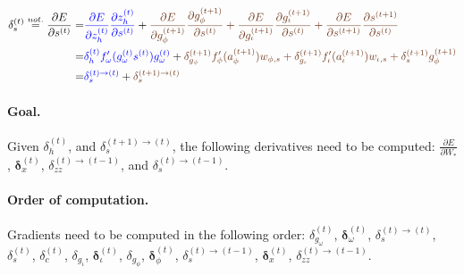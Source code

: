 \documentclass[11pt]{article}
\begin{document}
\begin{equation}
\begin{split}
    \delta_{s}^{(t)} \overset{not.}{=} \displaystyle\frac{\partial E}{\partial s^{(t)}} = &
    {\color{blue} \displaystyle\frac{\partial E}{\partial z_h^{(t)}}
    \displaystyle\frac{\partial z_h^{(t)}}{\partial s^{(t)}}} +
    {\color{auburn}\displaystyle\frac{\partial E}{\partial g_{\phi}^{(t+1)}}
    \displaystyle\frac{\partial g_{\phi}^{(t+1)}}{\partial s^{(t)}} +
    \displaystyle\frac{\partial E}{\partial g_{\iota}^{(t+1)}}
    \displaystyle\frac{\partial g_{\iota}^{(t+1)}}{\partial s^{(t)}} +
    \displaystyle\frac{\partial E}{\partial s^{(t+1)}}
    \displaystyle\frac{\partial s^{(t+1)}}{\partial s^{(t)}}} \\
    = & {\color{blue} \delta_{h}^{(t)} f_{\omega}'(g_{\omega}^{(t)}s^{(t)}) g_{\omega}^{(t)}} +
        {\color{auburn}\delta_{g_{\phi}}^{(t+1)}f_{\phi}'(a_{\phi}^{(t+1)})w_{\phi, s} +
        \delta_{g_{\iota}}^{(t+1)}f_{\iota}'(a_{\iota}^{(t+1)})w_{\iota, s} +
        \delta_{s}^{(t+1)}g_{\phi}^{(t+1)}} \\
    = & {\color{blue}\delta^{(t) \rightarrow (t)}_s} +
        {\color{auburn}\delta^{(t+1) \rightarrow (t)}_s}
\end{split}
\end{equation}

\paragraph{Goal.} Given $\delta_h^{(t)}$, and $\delta^{(t+1) \rightarrow (t)}_s$, the following derivatives need to be computed: $\displaystyle \frac{\partial E}{\partial W_{*}}$, $\boldsymbol{\delta}_x^{(t)}$, $\delta_{zz}^{(t)\rightarrow(t-1)}$, and $\delta^{(t) \rightarrow (t-1)}_s$.

\paragraph{Order of computation.}
Gradients need to be computed in the following order: $\delta_{g_{\omega}}^{(t)}$, $\boldsymbol{\delta}_{\omega}^{(t)}$, $\delta_s^{(t) \rightarrow (t)}$, $\delta_s^{(t)}$, $\delta_c^{(t)}$, $\delta_{g_{\iota}}$, $\boldsymbol{\delta}_{\iota}^{(t)}$, $\delta_{g_{\phi}}$, $\boldsymbol{\delta}_{\phi}^{(t)}$,
$\delta_s^{(t) \rightarrow (t-1)}$, $\boldsymbol{\delta}_x^{(t)}$, $\delta_{zz}^{(t)\rightarrow(t-1)}$.
\end{document}
